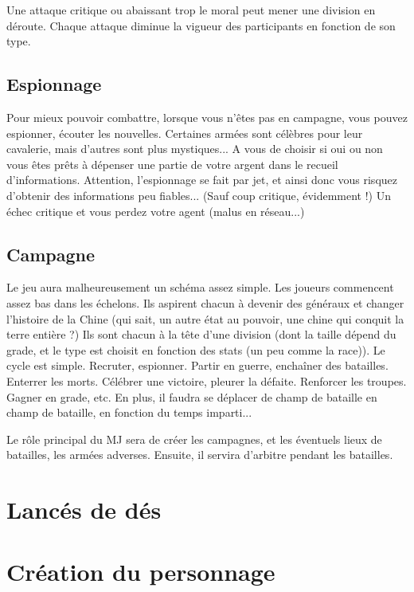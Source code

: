 \documentclass[french]{article}
\begin{document}
Une attaque critique ou abaissant trop le moral peut mener une division en déroute.
Chaque attaque diminue la vigueur des participants en fonction de son type.


\subsection{Espionnage}

Pour mieux pouvoir combattre, lorsque vous n'êtes pas en campagne, vous pouvez espionner, écouter les nouvelles. Certaines armées sont célèbres pour leur cavalerie, mais d'autres sont plus mystiques... A vous de choisir si oui ou non vous êtes prêts à dépenser une partie de votre argent dans le recueil d'informations.
Attention, l'espionnage se fait par jet, et ainsi donc vous risquez d'obtenir des informations peu fiables... (Sauf coup critique, évidemment !)
Un échec critique et vous perdez votre agent (malus en réseau...)


\subsection{Campagne}

Le jeu aura malheureusement un schéma assez simple. Les joueurs commencent assez bas dans les échelons. Ils aspirent chacun à devenir des généraux et changer l'histoire de la Chine (qui sait, un autre état au pouvoir, une chine qui conquit la terre entière ?)
Ils sont chacun à la tête d'une division (dont la taille dépend du grade, et le type est choisit en fonction des stats (un peu comme la race)).
Le cycle est simple. Recruter, espionner. Partir en guerre, enchaîner des batailles. Enterrer les morts. Célébrer une victoire, pleurer la défaite. Renforcer les troupes. Gagner en grade, etc. En plus, il faudra se déplacer de champ de bataille en champ de bataille, en fonction du temps imparti...

Le rôle principal du MJ sera de créer les campagnes, et les éventuels lieux de batailles, les armées adverses. Ensuite, il servira d'arbitre pendant les batailles.



\section{Lancés de dés}

\section{Création du personnage}
\end{document}
